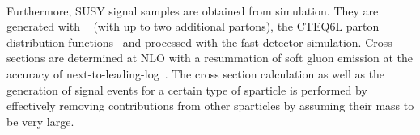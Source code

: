 \\
Furthermore, SUSY signal samples are obtained from simulation. They are generated with \madgraph~\cite{Alwall:2014hca} (with up to two additional partons), the CTEQ6L parton distribution functions~\cite{Pumplin:2002vw} and processed with the fast detector simulation. Cross sections are determined at NLO with a resummation of soft gluon emission at the accuracy of next-to-leading-log~\cite{Beenakker:1996ch, PhysRevLett.102.111802, PhysRevD.80.095004, Beenakker:2009ha, Beenakker:2011fu, Kramer:2012bx}. The cross section calculation as well as the generation of signal events for a certain type of sparticle is performed by effectively removing contributions from other sparticles by assuming their mass to be very large.

